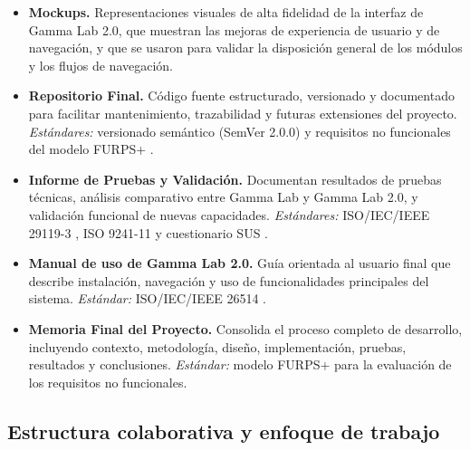 \documentclass{article}
\begin{document}
\begin{itemize}[label={}]
    \item \textbf{Mockups.}
    Representaciones visuales de alta fidelidad de la interfaz de Gamma Lab 2.0, que muestran las mejoras de experiencia de usuario y de navegación, y que se usaron para validar la disposición general de los módulos y los flujos de navegación.

    \item \textbf{Repositorio Final.}
    Código fuente estructurado, versionado y documentado para facilitar mantenimiento, trazabilidad y futuras extensiones del proyecto. \textit{Estándares:} versionado semántico (SemVer 2.0.0) \cite{semver} y requisitos no funcionales del modelo FURPS+ \cite{eeles2001}.

    \item \textbf{Informe de Pruebas y Validación.}
    Documentan resultados de pruebas técnicas, análisis comparativo entre Gamma Lab y Gamma Lab 2.0, y validación funcional de nuevas capacidades. \textit{Estándares:} ISO/IEC/IEEE 29119-3 \cite{iso29119-3}, ISO 9241-11 \cite{iso9241-11} y cuestionario SUS \cite{brooke1996}.

    \item \textbf{Manual de uso de Gamma Lab 2.0.}
    Guía orientada al usuario final que describe instalación, navegación y uso de funcionalidades principales del sistema. \textit{Estándar:} ISO/IEC/IEEE 26514 \cite{iso26514}.

    \item \textbf{Memoria Final del Proyecto.}
    Consolida el proceso completo de desarrollo, incluyendo contexto, metodología, diseño, implementación, pruebas, resultados y conclusiones. \textit{Estándar:} modelo FURPS+ \cite{eeles2001} para la evaluación de los requisitos no funcionales.
\end{itemize}

\subsection{Estructura colaborativa y enfoque de trabajo}
\end{document}
